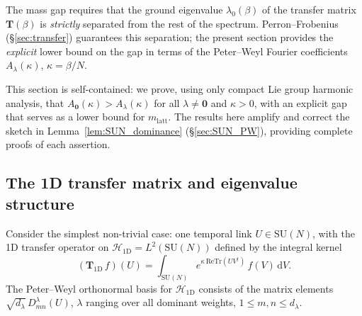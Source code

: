 \documentclass[11pt,a4paper]{amsart}
\theoremstyle{definition}
\newcommand{\SU}{\mathrm{SU}}
\newcommand{\re}{\mathrm{Re}}
\newcommand{\Tr}{\mathrm{Tr}}
\begin{document}
The mass gap requires that the ground eigenvalue $\lambda_0(\beta)$ of the
transfer matrix $\mathbf{T}(\beta)$ is \emph{strictly} separated from the
rest of the spectrum.  Perron--Frobenius (§\ref{sec:transfer}) guarantees
this separation; the present section provides the \emph{explicit} lower bound
on the gap in terms of the Peter--Weyl Fourier coefficients $A_\lambda(\kappa)$,
$\kappa = \beta/N$.

This section is self-contained: we prove, using only compact Lie group harmonic
analysis, that $A_\mathbf{0}(\kappa) > A_\lambda(\kappa)$ for all
$\lambda \ne \mathbf{0}$ and $\kappa > 0$, with an explicit gap that serves
as a lower bound for $m_{\mathrm{latt}}$.  The results here amplify and correct
the sketch in Lemma~\ref{lem:SUN_dominance} (§\ref{sec:SUN_PW}), providing
complete proofs of each assertion.

\subsection{The 1D transfer matrix and eigenvalue structure}
\label{sec:rep_1D}

Consider the simplest non-trivial case: one temporal link $U \in \SU(N)$,
with the 1D transfer operator on $\mathcal{H}_{\mathrm{1D}} = L^2(\SU(N))$
defined by the integral kernel
\begin{equation}
\label{eq:T1D}
  (\mathbf{T}_{\mathrm{1D}}\,f)(U)
  = \int_{\SU(N)} e^{\kappa\,\re\Tr(UV^\dagger)}\,f(V)\,\mathrm{d}V.
\end{equation}
The Peter--Weyl orthonormal basis for $\mathcal{H}_{\mathrm{1D}}$ consists of
the matrix elements $\sqrt{d_\lambda}\,D^\lambda_{mn}(U)$, $\lambda$ ranging
over all dominant weights, $1\le m,n\le d_\lambda$.
\end{document}
